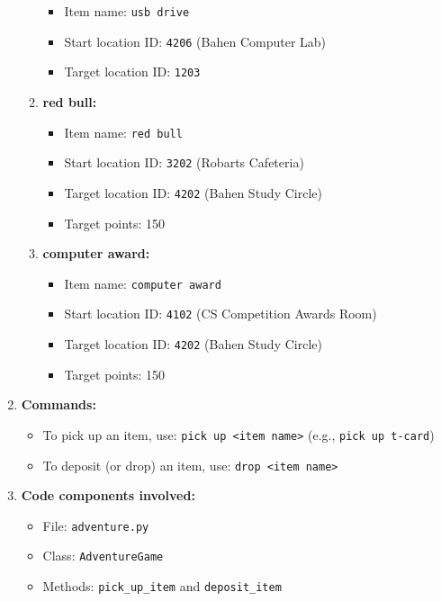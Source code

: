\documentclass[11pt]{article}
\begin{document}
\begin{enumerate}
\begin{enumerate}
        \begin{itemize}
            \item Item name: \texttt{usb drive}
            \item Start location ID: \texttt{4206} (Bahen Computer Lab)
            \item Target location ID: \texttt{1203}
        \end{itemize}
        \item \textbf{red bull:}
        \begin{itemize}
            \item Item name: \texttt{red bull}
            \item Start location ID: \texttt{3202} (Robarts Cafeteria)
            \item Target location ID: \texttt{4202} (Bahen Study Circle)
            \item Target points: 150
        \end{itemize}
        \item \textbf{computer award:}
        \begin{itemize}
            \item Item name: \texttt{computer award}
            \item Start location ID: \texttt{4102} (CS Competition Awards Room)
            \item Target location ID: \texttt{4202} (Bahen Study Circle)
            \item Target points: 150
        \end{itemize}
    \end{enumerate}
    
    \item \textbf{Commands:}
    \begin{itemize}
        \item To pick up an item, use: \texttt{pick up <item name>} \quad (e.g., \texttt{pick up t-card})
        \item To deposit (or drop) an item, use: \texttt{drop <item name>}
    \end{itemize}
    
    \item \textbf{Code components involved:}
    \begin{itemize}
        \item File: \texttt{adventure.py}
        \item Class: \texttt{AdventureGame}
        \item Methods: \texttt{pick\_up\_item} and \texttt{deposit\_item}
    \end{itemize}
\end{enumerate}
\end{document}
